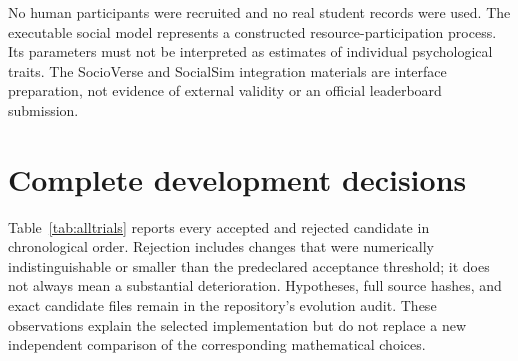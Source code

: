 \documentclass[10pt]{article}
\begin{document}
No human participants were recruited and no real student records were used. The executable social model represents a constructed resource-participation process. Its parameters must not be interpreted as estimates of individual psychological traits. The SocioVerse and SocialSim integration materials are interface preparation, not evidence of external validity or an official leaderboard submission.

\section{Complete development decisions}
\label{app:trials}
Table~\ref{tab:alltrials} reports every accepted and rejected candidate in chronological order. Rejection includes changes that were numerically indistinguishable or smaller than the predeclared acceptance threshold; it does not always mean a substantial deterioration. Hypotheses, full source hashes, and exact candidate files remain in the repository's evolution audit. These observations explain the selected implementation but do not replace a new independent comparison of the corresponding mathematical choices.
\footnotesize

\end{document}
